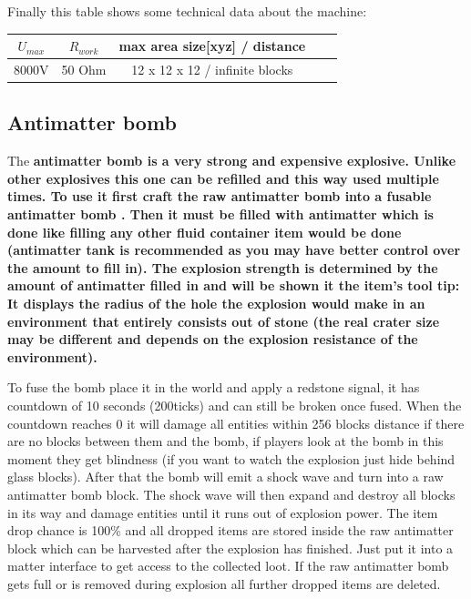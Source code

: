 \documentclass[11pt]{article} %
\begin{document}
Finally this table shows some technical data about the machine: \\
\begin{tabular}{| c | c | c | c | c |} \hline
\bf $U_{max}$ & \bf $R_{work}$  & \bf max area size[xyz] / distance \\ \hline
8000V & 50 Ohm & 12 x 12 x 12 / infinite blocks \\ \hline
\end{tabular}

\subsection{Antimatter bomb}
The \bf antimatter bomb \rm is a very strong and expensive explosive. Unlike other explosives this one can be refilled and this way used multiple times. To use it first craft the \bf raw antimatter bomb \rm into a \bf fusable antimatter bomb \rm. Then it must be filled with antimatter which is done like filling any other fluid container item would be done (antimatter tank is recommended as you may have better control over the amount to fill in). The explosion strength is determined by the amount of antimatter filled in and will be shown it the item's tool tip: It displays the radius of the hole the explosion would make in an environment that entirely consists out of stone (the real crater size may be different and depends on the explosion resistance of the environment). 

To fuse the bomb place it in the world and apply a redstone signal, it has countdown of 10 seconds (200ticks) and can still be broken once fused. When the countdown reaches 0 it will damage all entities within 256 blocks distance if there are no blocks between them and the bomb, if players look at the bomb in this moment they get blindness (if you want to watch the explosion just hide behind glass blocks). After that the bomb will emit a shock wave and turn into a raw antimatter bomb block. The shock wave will then expand and destroy all blocks in its way and damage entities until it runs out of explosion power. The item drop chance is 100\% and all dropped items are stored inside the raw antimatter block which can be harvested after the explosion has finished. Just put it into a matter interface to get access to the collected loot. If the raw antimatter bomb gets full or is removed during explosion all further dropped items are deleted.
\end{document}
